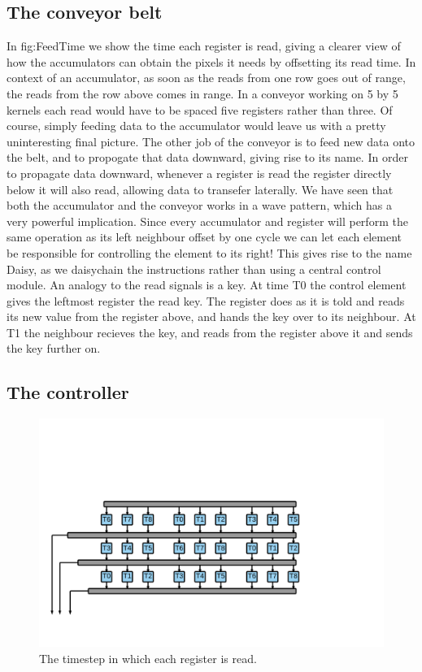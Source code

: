 \subsection{The conveyor belt}
In fig:FeedTime we show the time each register is read, giving a clearer view of how the accumulators can obtain the pixels it needs by offsetting its read time.
In context of an accumulator, as soon as the reads from one row goes out of range, the reads from the row above comes in range. In a conveyor working on 5 by 5 kernels each read would have to be spaced five registers rather than three.
Of course, simply feeding data to the accumulator would leave us with a pretty uninteresting final picture. 
The other job of the conveyor is to feed new data onto the belt, and to propogate that data downward, giving rise to its name. 
In order to propagate data downward, whenever a register is read the register directly below it will also read, allowing data to transefer laterally.
We have seen that both the accumulator and the conveyor works in a wave pattern, which has a very powerful implication.
Since every accumulator and register will perform the same operation as its left neighbour offset by one cycle we can let each element be responsible for controlling the element to its right!
This gives rise to the name Daisy, as we daisychain the instructions rather than using a central control module.
An analogy to the read signals is a key. At time T0 the control element gives the leftmost register the read key. 
The register does as it is told and reads its new value from the register above, and hands the key over to its neighbour. 
At T1 the neighbour recieves the key, and reads from the register above it and sends the key further on.

\subsection{The controller}

\begin{figure}[h!]
    \includegraphics[width=\linewidth]{img/FeederTimeAnnotated.png}
    \caption{The timestep in which each register is read.}
    \label{fig:FeedTime}
\end{figure}
